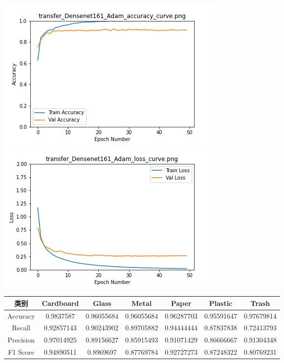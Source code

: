 \documentclass[UTF8]{ctexart}
\begin{document}
\includegraphics[scale=0.5]{image/transfer_Densenet161_Adam_accuracy_curve.png} 
\includegraphics[scale=0.5]{image/transfer_Densenet161_Adam_loss_curve.png} 


\begin{tabular}{|c|c|c|c|c|c|c|}
\hline 
类别 & Cardboard & Glass & Metal & Paper & Plastic & Trash \\ 
\hline 
Accuracy &0.9837587&  0.96055684& 0.96055684& 0.96287703 &0.95591647& 0.97679814\\
 \hline 
Recall &0.92857143& 0.90243902& 0.89705882& 0.94444444& 0.87837838& 0.72413793\\ 
\hline 
Precision &0.97014925& 0.89156627& 0.85915493& 0.91071429& 0.86666667& 0.91304348\\ 
\hline 
F1 Score &0.94890511& 0.8969697 & 0.87769784& 0.92727273& 0.87248322& 0.80769231\\ 
\hline 
\end{tabular}
\end{document}
